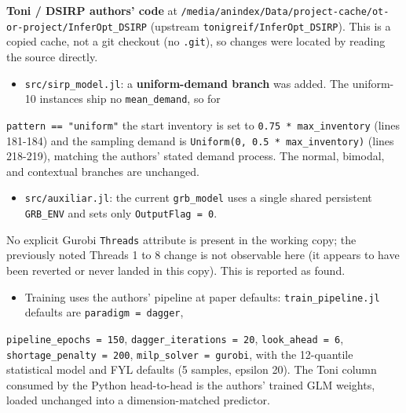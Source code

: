 \documentclass[10pt]{article}
\begin{document}
\textbf{Toni / DSIRP authors' code} at \texttt{/media/anindex/Data/project-cache/ot-or-project/InferOpt\_DSIRP} (upstream
\texttt{tonigreif/InferOpt\_DSIRP}). This is a copied cache, not a git checkout (no \texttt{.git}), so changes were located by reading
the source directly.
\begin{itemize}\setlength{\itemsep}{2pt}
\item \texttt{src/sirp\_model.jl}: a \textbf{uniform-demand branch} was added. The uniform-10 instances ship no \texttt{mean\_demand}, so for
\end{itemize}
  \texttt{pattern == "uniform"} the start inventory is set to \texttt{0.75 * max\_inventory} (lines 181-184) and the sampling demand is
  \texttt{Uniform(0, 0.5 * max\_inventory)} (lines 218-219), matching the authors' stated demand process. The normal, bimodal,
  and contextual branches are unchanged.
\begin{itemize}\setlength{\itemsep}{2pt}
\item \texttt{src/auxiliar.jl}: the current \texttt{grb\_model} uses a single shared persistent \texttt{GRB\_ENV} and sets only \texttt{OutputFlag = 0}.
\end{itemize}
  No explicit Gurobi \texttt{Threads} attribute is present in the working copy; the previously noted Threads 1 to 8 change is
  not observable here (it appears to have been reverted or never landed in this copy). This is reported as found.
\begin{itemize}\setlength{\itemsep}{2pt}
\item Training uses the authors' pipeline at paper defaults: \texttt{train\_pipeline.jl} defaults are \texttt{paradigm = dagger},
\end{itemize}
  \texttt{pipeline\_epochs = 150}, \texttt{dagger\_iterations = 20}, \texttt{look\_ahead = 6}, \texttt{shortage\_penalty = 200}, \texttt{milp\_solver = gurobi},
  with the 12-quantile statistical model and FYL defaults (5 samples, epsilon 20). The Toni column consumed by the
  Python head-to-head is the authors' trained GLM weights, loaded unchanged into a dimension-matched predictor.
\end{document}
